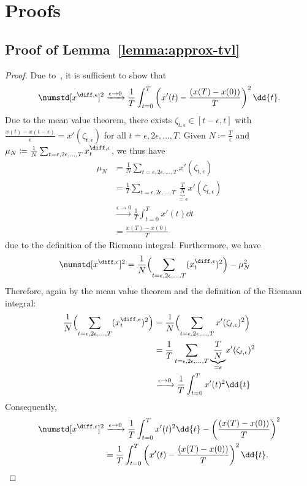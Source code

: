 
\section{Proofs}\label{sec:proofs}
\subsection{Proof of Lemma~\ref{lemma:approx-tvl}}
\begin{proof}
Due to~, it is sufficient to show that
%
\begin{equation}\label{eq:convergence_numstd}
	\numstd[x^{\diff,\epsilon}]^2
	\xrightarrow{\epsilon \to 0}
	\frac{1}{T}\int_{t=0}^{T} \left(x'(t) - \frac{(x(T)-x(0))}{T}\right)^{2} \dd{t}.
\end{equation}
%
Due to the mean value theorem, there exists ${\zeta_{t,\epsilon} \in [t-\epsilon,t]}$
with ${\frac{x(t) - x(t-\epsilon)}{\epsilon} = x'(\zeta_{t,\epsilon})}$
for all ${t=\epsilon,2\epsilon,\dots,T}$.
Given ${N \coloneqq \frac{T}{\epsilon}}$ and ${\mu_N\coloneqq \frac{1}{N} \sum_{t=\epsilon,2\epsilon,\dots,T} x^{\diff,\epsilon}_{t}}$, we thus have
%
\begin{subequations}
\begin{align}
	\mu_N &= \frac{1}{N}\sum_{t=\epsilon,2\epsilon,\dots,T} x'(\zeta_{t,\epsilon})
\\	&=\frac{1}{T}\sum_{t=\epsilon,2\epsilon,\dots,T}\underset{=\epsilon}{\underbrace{\frac{T}{N}}} x'(\zeta_{t,\epsilon})
\\	&\xrightarrow{\epsilon \to 0} \frac{1}{T} \int_{t=0}^{T} x'(t) \dd{t}
\\	&= \frac{x(T)-x(0)}{T}
\end{align}
\end{subequations}
%
due to the definition of the Riemann integral. Furthermore, we have
%
\begin{align}
	\numstd[x^{\diff,\epsilon}]^2
	&= \frac{1}{N}\Bigl(\sum_{t=\epsilon,2\epsilon,\dots,T} (x^{\diff,\epsilon}_t)^{2}\Bigr)
	- \mu_N^{2}
\end{align}
%
Therefore, again by the mean value theorem and the definition of the Riemann integral:
%
\begin{subequations}
\begin{align}
	\frac{1}{N}\Bigl(\sum_{t=\epsilon,2\epsilon,\dots,T} (x^{\diff,\epsilon}_t)^{2}\Bigr)
	&= \frac{1}{N} \Bigl(\sum_{t=\epsilon,2\epsilon,\dots,T} x'(\zeta_{t,\epsilon})^{2}\Bigr)
\\	&= \frac{1}{T} \sum_{t=\epsilon,2\epsilon,\dots,T}  \underset{=\epsilon}{\underbrace{\frac{T}{N}}} x'(\zeta_{t,\epsilon})^{2}
\\	&\xrightarrow{\epsilon \to 0} \frac{1}{T} \int_{t=0}^{T} x'(t)^{2} \dd{t}
\end{align}
\end{subequations}
%
Consequently,
%
\begin{align}
	\numstd[x^{\diff,\epsilon}]^2
	&\xrightarrow{\epsilon \to 0}
	\frac{1}{T}\int_{t=0}^{T} x'(t)^{2} \dd{t} - \left(\frac{(x(T)-x(0))}{T}\right)^{2}
\\	&= \frac{1}{T}\int_{t=0}^{T} \left(x'(t) - \frac{(x(T)-x(0))}{T}\right)^{2} \dd{t}.
\end{align}
\end{proof}


